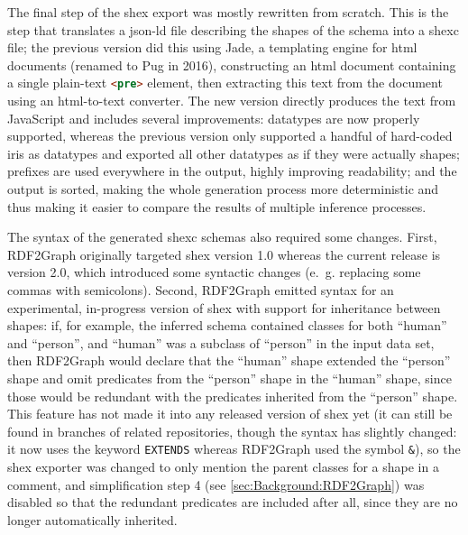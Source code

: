 The final step of the \gls{shex} export was mostly rewritten from scratch.
This is the step that translates a \gls{json-ld} file describing the shapes of the schema
into a \gls{shexc} file;
the previous version did this using Jade,
a templating engine for \gls{html} documents (renamed to Pug in 2016),
constructing an \gls{html} document containing a single plain-text \lstinline[language=html]{<pre>} element,
then extracting this text from the document using an \gls{html}-to-text converter.
The new version directly produces the text from \gls{JavaScript}
and includes several improvements:
datatypes are now properly supported,
whereas the previous version only supported a handful of hard-coded \glspl{iri} as datatypes
and exported all other datatypes as if they were actually \glspl{shape};
prefixes are used everywhere in the output, highly improving readability;
and the output is sorted, making the whole generation process more deterministic
and thus making it easier to compare the results of multiple inference processes.

The syntax of the generated \gls{shexc} \glspl{schema}
also required some changes.
First, \gls{RDF2Graph} originally targeted \gls{shex} version 1.0
whereas the current release is version 2.0,
which introduced some syntactic changes
(e.~g. replacing some commas with semicolons).
Second, \gls{RDF2Graph} emitted syntax for an experimental, in-progress version of \gls{shex}
with support for inheritance between \glspl{shape}:
if, for example, the inferred \gls{schema} contained classes for both “human” and “person”,
and “human” was a subclass of “person” in the input data set,
then \gls{RDF2Graph} would declare that the “human” \gls{shape} extended the “person” \gls{shape}
and omit \glspl{predicate} from the “person” \gls{shape} in the “human” \gls{shape},
since those would be redundant with the \glspl{predicate} inherited from the “person” \gls{shape}.
This feature has not made it into any released version of \gls{shex} yet
(it can still be found in  branches of related repositories,
though the syntax has slightly changed:
it now uses the keyword \lstinline{EXTENDS} whereas \gls{RDF2Graph} used the symbol \lstinline{&}),
so the \gls{shex} exporter was changed to only mention the parent classes for a \gls{shape} in a comment,
and simplification step 4 (see \cref{sec:Background:RDF2Graph}) was disabled
so that the redundant \glspl{predicate} are included after all,
since they are no longer automatically inherited.

